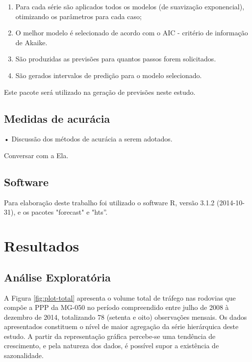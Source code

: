 \documentclass[
	12pt,				%
	openright,			%
	twoside,			%
	a4paper,			%
	english,			%
	french,				%
	spanish,			%
	brazil				%
	]{abntex2}
\begin{document}
\begin{enumerate}
\item Para cada série são aplicados todos os modelos (de suavização exponencial), otimizando os parâmetros para cada caso;
\item O melhor modelo é selecionado de acordo com o AIC - critério de informação de Akaike. %
\item São produzidas as previsões para quantos passos forem solicitados.
\item São gerados intervalos de predição para o modelo selecionado. %
\end{enumerate}

Este pacote será utilizado na geração de previsões neste estudo.

\section{Medidas de acurácia}

•	Discussão dos métodos de acurácia a serem adotados.

Conversar com a Ela.

\section{Software}
Para elaboração deste trabalho foi utilizado o software R, versão 3.1.2 (2014-10-31), e os pacotes "forecast" e "hts''.

\chapter{Resultados}

\section{Análise Exploratória}

A Figura \ref{fig:plot-total} apresenta o volume total de tráfego nas rodovias que compõe a PPP da MG-050 no período compreendido entre julho de 2008 à dezembro de 2014, totalizando 78 (setenta e oito) observações mensais. Os dados apresentados constituem o nível de maior agregação da série hierárquica deste estudo.
A partir da representação gráfica percebe-se uma tendência de crescimento, e pela natureza dos dados, é possível supor a existência de sazonalidade.
\end{document}
